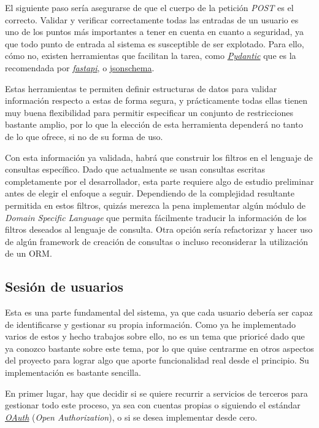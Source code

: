 El siguiente paso sería asegurarse de que el cuerpo de la petición \textit{POST} es el correcto. Validar y verificar correctamente todas las entradas de un usuario es uno de los puntos más importantes a tener en cuenta en cuanto a seguridad, ya que todo punto de entrada al sistema es susceptible de ser explotado. Para ello, cómo no, existen herramientas que facilitan la tarea, como \href{https://docs.pydantic.dev/latest/}{\textit{Pydantic}} que es la recomendada por \href{https://fastapi.tiangolo.com/tutorial/body/}{\textit{fastapi}}, o \href{https://python-jsonschema.readthedocs.io/en/stable/}{jsonschema}. 

Estas herramientas te permiten definir estructuras de datos para validar información respecto a estas de forma segura, y prácticamente todas ellas tienen muy buena flexibilidad para permitir especificar un conjunto de restricciones bastante amplio, por lo que la elección de esta herramienta dependerá no tanto de lo que ofrece, si no de su forma de uso.

Con esta información ya validada, habrá que construir los filtros en el lenguaje de consultas específico. Dado que actualmente se usan consultas escritas completamente por el desarrollador, esta parte requiere algo de estudio preliminar antes de elegir el enfoque a seguir. Dependiendo de la complejidad resultante permitida en estos filtros, quizás merezca la pena implementar algún módulo de \textit{Domain Specific Language} que permita fácilmente traducir la información de los filtros deseados al lenguaje de consulta. Otra opción sería refactorizar y hacer uso de algún framework de creación de consultas o incluso reconsiderar la utilización de un ORM.

\subsection{Sesión de usuarios}

Esta es una parte fundamental del sistema, ya que cada usuario debería ser capaz de identificarse y gestionar su propia información. Como ya he implementado varios de estos y hecho trabajos sobre ello, no es un tema que prioricé dado que ya conozco bastante sobre este tema, por lo que quise centrarme en otros aspectos del proyecto para lograr algo que aporte funcionalidad real desde el principio. Su implementación es bastante sencilla.

En primer lugar, hay que decidir si se quiere recurrir a servicios de terceros para gestionar todo este proceso, ya sea con cuentas propias o siguiendo el estándar \href{https://oauth.net/2/}{\textit{OAuth}} (\textit{Open Authorization}), o si se desea implementar desde cero.

